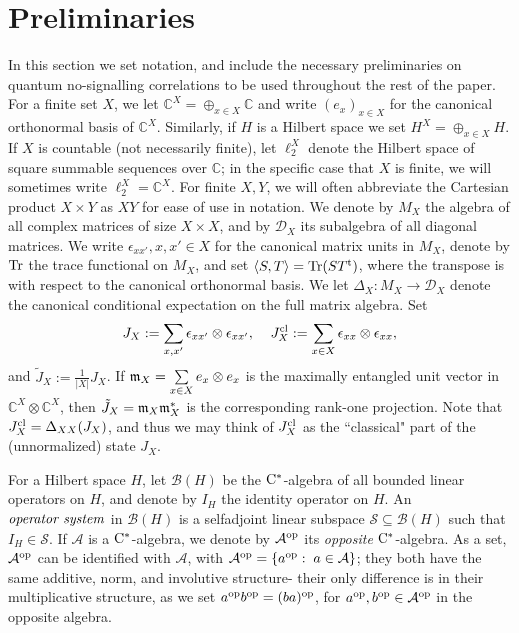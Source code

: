 \documentclass[11pt]{amsart}
\newcommand{\cl}[1]{\mathcal{#1}}
\newcommand{\bb}[1]{\mathbb{#1}}
\begin{document}
\section{Preliminaries}\label{s_prelim}
In this section we set notation, and include the necessary preliminaries on quantum no-signalling correlations to be used throughout the rest of the paper. For a finite set $X$, we let $\bb{C}^{X} = \oplus_{x \in X}\bb{C}$ and write $(e_{x})_{x \in X}$ for the canonical orthonormal basis of $\bb{C}^{X}$. Similarly, if $H$ is a Hilbert space we set $H^{X} = \oplus_{x \in X}H$. If $X$ is countable (not necessarily finite), let $\ell_{2}^{X}$ denote the Hilbert space of square summable sequences over $\bb{C}$; in the specific case that $X$ is finite, we will sometimes write $\ell_{2}^{X} = \bb{C}^{X}$. For finite $X, Y$, we will often abbreviate the Cartesian product $X\times Y$ as $XY$ for ease of use in notation. We denote by $M_{X}$ the algebra of all complex matrices of size $X\times X$, and by $\cl{D}_{X}$ its subalgebra of all diagonal matrices. We write $\epsilon_{xx'}, x, x' \in X$ for the canonical matrix units in $M_{X}$, denote by ${\rm Tr}$ the trace functional on $M_{X}$, and set $\langle S, T\rangle = {\rm Tr}(ST^{\rm t})$, where the transpose is with respect to the canonical orthonormal basis. We let $\Delta_{X}: M_{X}\rightarrow \cl{D}_{X}$ denote the canonical conditional expectation on the full matrix algebra. Set
\begin{gather*}
	J_{X} := \sum\limits_{x, x'}\epsilon_{xx'}\otimes \epsilon_{xx'}, \;\;\;\; J_{X}^{\rm cl} := \sum\limits_{x \in X}\epsilon_{xx}\otimes \epsilon_{xx},
\end{gather*}
\noindent and $\tilde{J}_{X} := \frac{1}{|X|}J_{X}$. If $\frak{m}_{X} = \sum\limits_{x \in X}e_{x}\otimes e_{x}$ is the maximally entangled unit vector in $\bb{C}^{X}\otimes \bb{C}^{X}$, then $\tilde{J}_{X} = \frak{m}_{X}\frak{m}_{X}^{*}$ is the corresponding rank-one projection. Note that $J_{X}^{\rm cl} = \Delta_{XX}(J_{X})$, and thus we may think of $J_{X}^{\rm cl}$ as the ``classical" part of the (unnormalized) state $J_{X}$.

For a Hilbert space $H$, let $\cl{B}(H)$ be the ${\rm C}^{*}$-algebra of all bounded linear operators on $H$, and denote by $I_{H}$ the identity operator on $H$. An ${\it operator \; system}$ in $\cl{B}(H)$ is a selfadjoint linear subspace $\cl{S} \subseteq \cl{B}(H)$ such that $I_{H} \in \cl{S}$. If $\cl{A}$ is a ${\rm C}^{*}$-algebra, we denote by $\cl{A}^{\rm op}$ its \textit{opposite} ${\rm C}^{*}$-algebra. As a set, $\cl{A}^{\rm op}$ can be identified with $\cl{A}$, with $\cl{A}^{\rm op} = \{a^{\rm op}: \; a \in \cl{A}\}$; they both have the same additive, norm, and involutive structure- their only difference is in their multiplicative structure, as we set $a^{\rm op}b^{\rm op} = (ba)^{\rm op}$, for $a^{\rm op}, b^{\rm op} \in \cl{A}^{\rm op}$ in the opposite algebra. 
\end{document}
